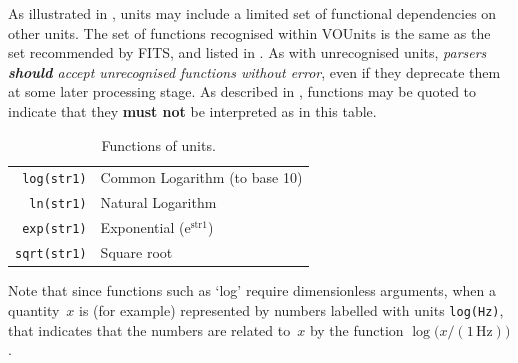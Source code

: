 \documentclass[11pt,a4paper]{ivoa}
\newcommand{\unit}[1]{\texttt{\small\color{orange}#1}}
\newcommand*\norm[1]{\textbf{\color{ivoacolor}#1}}
\def\eg{e.g.,~}
\begin{document}
As illustrated in , units may include a
limited set of functional dependencies on other units.  The set of
functions recognised within VOUnits is the same as the set recommended
by FITS, and listed in .  As with
unrecognised units,
\emph{parsers \norm{should} accept unrecognised functions without error},
even if they deprecate them at some later processing stage.  As
described in , functions may be quoted to
indicate that they \norm{must not} be interpreted as in this table.
\begin{table}%
\begin{center}
\def\arraystretch{1.2}
\begin{tabular}{|r|l|}
\hline
\unit{log(str1)} & Common Logarithm (to base 10) \\
\unit{ln(str1)} & Natural Logarithm \\
\unit{exp(str1)} & Exponential (e$^{\mathrm{str1}}$) \\
\unit{sqrt(str1)} & Square root \\
\hline
\end{tabular}
\end{center}
\caption{\label{tab:functions}Functions of units.}
\end{table}
Note that since functions such as `log' require dimensionless
arguments, when a quantity~$x$ is (for example) represented by numbers
labelled with units \unit{log(Hz)}, that indicates that the numbers
are related to~$x$ by the function
$\log\bigl(x/(\mathrm{1\,Hz})\bigr)$.

%
%
%
%
\end{document}
